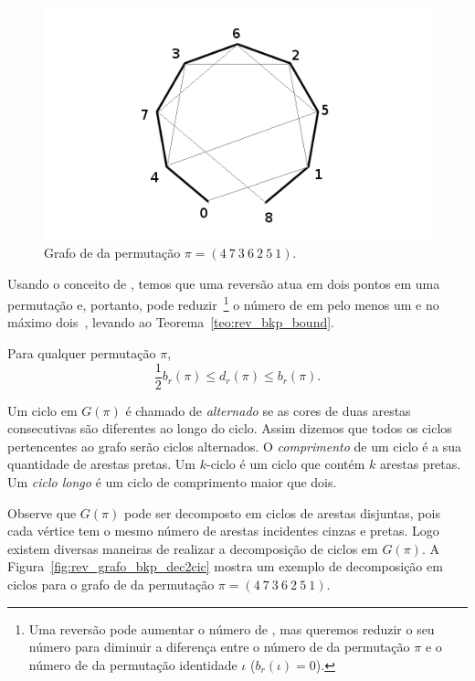 \begin{figure}[h]
  \centering 
  \includegraphics[scale=0.6]{images/rev_grafo_bkp.png} 
  \caption{Grafo de \bkp{} da permutação $\pi = (4~7~3~6~2~5~1)$.}
  \label{fig:rev_grafo_bkp}
\end{figure}

Usando o conceito de \bkp{}, temos que uma reversão atua em dois pontos
em uma permutação e, portanto, pode reduzir~\footnote{Uma reversão pode
aumentar o número de \bkp{}, mas queremos reduzir o seu número
para diminuir a diferença entre o número de \bkp{} da permutação
$\pi$ e o número de \bkp{} da permutação identidade $\iota$
($b_r(\iota) = 0$).} o número de \bkp{} em pelo menos um e no máximo
dois~\cite{BafnaPevzner*1996}, levando ao
Teorema~\ref{teo:rev_bkp_bound}.

\begin{teo}
\label{teo:rev_bkp_bound}
Para qualquer permutação $\pi$, 
\[\frac{1}{2} b_r(\pi) \leq d_r(\pi) \leq
  b_r(\pi).
\]
\end{teo}

Um ciclo em $G(\pi)$ é chamado de \textit{alternado} se as cores de duas
arestas consecutivas são diferentes ao longo do ciclo. Assim dizemos que
todos os ciclos pertencentes ao grafo serão ciclos alternados. O
\textit{comprimento} de um ciclo é a sua quantidade de arestas pretas.
Um $k$-ciclo é um ciclo que contém $k$ arestas pretas. Um \textit{ciclo
longo} é um ciclo de comprimento maior que dois.

Observe que $G(\pi)$ pode ser decomposto em ciclos de arestas disjuntas,
pois cada vértice tem o mesmo número de arestas incidentes cinzas e
pretas. Logo existem diversas maneiras de realizar a decomposição de
ciclos em $G(\pi)$. A Figura~\ref{fig:rev_grafo_bkp_dec2cic} mostra um
exemplo de decomposição em ciclos para o grafo de \bkp{} da permutação
$\pi = (4~7~3~6~2~5~1)$.

